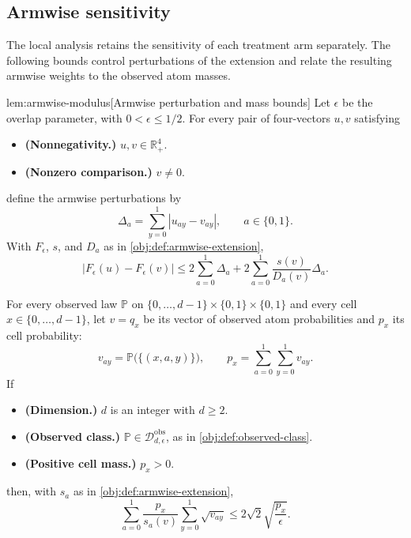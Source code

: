\documentclass[11pt]{article}
\begin{document}
\subsection{Armwise sensitivity}

The local analysis retains the sensitivity of each treatment arm separately. The following bounds control perturbations of the extension and relate the resulting armwise weights to the observed atom masses.

\begin{lemmav}{lem:armwise-modulus}[Armwise perturbation and mass bounds]
Let \(\epsilon\) be the overlap parameter, with \(0<\epsilon\leq 1/2\). For every pair of four-vectors \(u,v\) satisfying
\begin{itemize}
\item \textbf{(Nonnegativity.)} \(u,v\in\mathbb R_+^4\).
\item \textbf{(Nonzero comparison.)} \(v\neq 0\).
\end{itemize}
define the armwise perturbations by
\[
\Delta_a=\sum_{y=0}^1|u_{ay}-v_{ay}|,\qquad a\in\{0,1\}.
\]
With \(F_\epsilon\), \(s\), and \(D_a\) as in \cref{obj:def:armwise-extension},
\[
|F_\epsilon(u)-F_\epsilon(v)|
\leq
2\sum_{a=0}^1\Delta_a
+
2\sum_{a=0}^1\frac{s(v)}{D_a(v)}\Delta_a.
\]

For every observed law \(\mathbb P\) on
\(\{0,\ldots,d-1\}\times\{0,1\}\times\{0,1\}\) and every cell \(x\in\{0,\ldots,d-1\}\), let \(v=q_x\) be its vector of observed atom probabilities and \(p_x\) its cell probability:
\[
v_{ay}=\mathbb P\bigl(\{(x,a,y)\}\bigr),
\qquad
p_x=\sum_{a=0}^1\sum_{y=0}^1v_{ay}.
\]
If
\begin{itemize}
\item \textbf{(Dimension.)} \(d\) is an integer with \(d\geq2\).
\item \textbf{(Observed class.)} \(\mathbb P\in\mathcal D_{d,\epsilon}^{\mathrm{obs}}\), as in \cref{obj:def:observed-class}.
\item \textbf{(Positive cell mass.)} \(p_x>0\).
\end{itemize}
then, with \(s_a\) as in \cref{obj:def:armwise-extension},
\[
\sum_{a=0}^1\frac{p_x}{s_a(v)}
\sum_{y=0}^1\sqrt{v_{ay}}
\leq
2\sqrt{2}\sqrt{\frac{p_x}{\epsilon}}.
\]
\end{lemmav}
\end{document}
